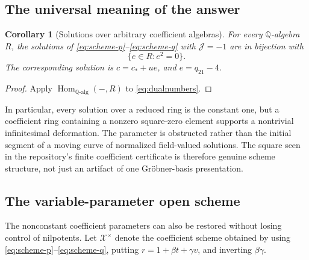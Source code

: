 \documentclass[11pt,a4paper]{article}
\numberwithin{equation}{section}
\newtheorem{corollary}[theorem]{Corollary}
\theoremstyle{definition}
\theoremstyle{remark}
\newcommand{\Q}{\mathbb{Q}}
\newcommand{\J}{\mathcal{J}}
\newcommand{\cstar}{c_*}
\begin{document}
\subsection{The universal meaning of the answer}

\begin{corollary}[Solutions over arbitrary coefficient algebras]
\label{cor:functor}
For every $\Q$-algebra $R$, the solutions of
\eqref{eq:scheme-p}--\eqref{eq:scheme-q} with $\J=-1$ are in bijection with
\[
\{e\in R:e^2=0\}.
\]
The corresponding solution is $c=\cstar+ue$, and $e=q_{21}-4$.
\end{corollary}
\begin{proof}
Apply $\operatorname{Hom}_{\Q\text{-alg}}(-,R)$ to
\eqref{eq:dualnumbers}.
\end{proof}

In particular, every solution over a reduced ring is the constant one, but
a coefficient ring containing a nonzero square-zero element supports a
nontrivial infinitesimal deformation. The parameter is obstructed rather
than the initial segment of a moving curve of normalized field-valued
solutions. The square seen in the repository's finite coefficient
certificate is therefore genuine scheme structure, not just an artifact
of one Gr\"obner-basis presentation.

\subsection{The variable-parameter open scheme}

The nonconstant coefficient parameters can also be restored without
losing control of nilpotents. Let $\mathcal X^{\times}$ denote the
coefficient scheme obtained by using \eqref{eq:scheme-p}--\eqref{eq:scheme-q},
putting $r=1+\beta t+\gamma v$, and inverting $\beta\gamma$.
\end{document}
